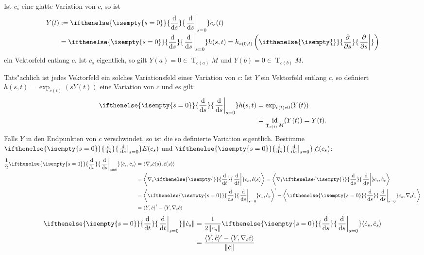 \documentclass[paper=A4, twoside, chapterprefix=true, bibliography=totoc, headsepline]{scrbook}
\DeclareMathOperator{\calL}{\mathcal{L}}
\DeclareMathOperator{\id}{id} %
\DeclareMathOperator{\T}{T} %
\newcommand{\dop}{\mathrm{d}}
\newcommand{\difffrac}[3][]{\ifthenelse{\isempty{#1}}{\frac{\dop #2}{\dop #3}}{\left. \frac{\dop #2}{\dop #3} \right|_{#1}}}
\newcommand{\pdifffrac}[3][]{\ifthenelse{\isempty{#1}}{\frac{\partial #2}{\partial #3}}{\left. \frac{\partial #2}{\partial #3} \right|_{#1}}}
\theoremstyle{plain}
\theoremstyle{nonumberplain}
\theoremstyle{empty}
\theoremstyle{break}
\begin{document}
Ist $c_s$ eine glatte Variation von $c$, so ist
\begin{align*}
  Y(t) &:= \difffrac[s=0]{}{s} c_s(t)\\
  &= \difffrac[s=0]{}{s} h(s,t) =
  h_{*(0,t)}\left(\pdifffrac{}{s}\right)
\end{align*}
ein Vektorfeld entlang $c$. Ist $c_s$ eigentlich, so gilt $Y(a) = 0
\in \T_{c(a)}M$ und $Y(b) = 0 \in \T_{c(b)}M$.
\begin{center}\end{center}
Tats"achlich ist jedes Vektorfeld ein solches Variationsfeld einer Variation von $c$: Ist $Y$ ein Vektorfeld entlang $c$, so definiert $h(s,t) = \exp_{c(t)}(s Y(t))$ eine Variation von $c$ und es gilt:
\begin{align*}
  \difffrac[s=0]{}{s} h(s,t) &= \exp_{c(t)*0}(Y(t))\\
  &= \id_{\T_{c(t)}M}(Y(t)) = Y(t).
\end{align*}
Falls $Y$ in den Endpunkten von $c$ verschwindet, so ist die so definierte Variation eigentlich.
Bestimme $\difffrac[s=0]{}{s} E(c_s)$ und $\difffrac[s=0]{}{s}\calL(c_s)$:
\begin{align*}
  \frac{1}{2} \difffrac[s=0]{}{s} \langle \dot c_s, \dot c_s \rangle &= \langle \nabla_s \dot c(s), \dot c(s) \rangle\\
  &= \left\langle \nabla_s \difffrac{}{t} c_s, \dot c(s) \right\rangle = \left\langle \nabla_t \difffrac{}{s} c_s, \dot c_s \right\rangle \\
  &= \left\langle \difffrac[s=0]{}{s} c_s, \dot c_s \right\rangle' - \left\langle \difffrac[s=0]{}{s} c_s, \nabla_t \dot c_s \right\rangle \\
  &= \left\langle Y, \dot c \right\rangle' - \left\langle Y, \nabla_t \dot c \right\rangle\\
\end{align*}
\begin{align*}
  \difffrac[s=0]{}{t} \|\dot c_s\| &= \frac{1}{2 \|c_s\|} \difffrac[s=0]{}{s} \langle \dot c_s, \dot c_s \rangle\\
  &= \frac{\langle Y, \dot c \rangle' - \langle Y, \nabla_t \dot c
    \rangle}{\|\dot c\|}
\end{align*}
\end{document}
